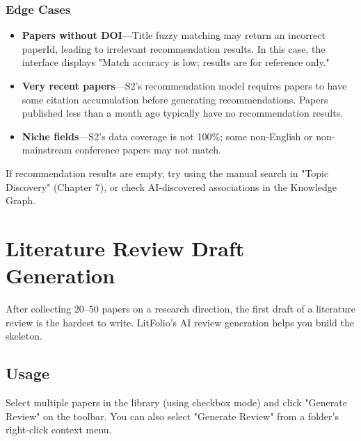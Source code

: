 \subsection{Edge Cases}

\begin{itemize}
  \item \textbf{Papers without DOI}---Title fuzzy matching may return an incorrect paperId,
    leading to irrelevant recommendation results. In this case, the interface displays "Match
    accuracy is low; results are for reference only."
  \item \textbf{Very recent papers}---S2's recommendation model requires papers to have some
    citation accumulation before generating recommendations. Papers published less than a month ago
    typically have no recommendation results.
  \item \textbf{Niche fields}---S2's data coverage is not 100\%; some non-English or
    non-mainstream conference papers may not match.
\end{itemize}

\begin{tipbox}
If recommendation results are empty, try using the manual search in "Topic Discovery" (Chapter 7),
or check AI-discovered associations in the Knowledge Graph.
\end{tipbox}

\chapter{Literature Review Draft Generation}
\label{ch:litreview}

After collecting 20--50 papers on a research direction, the first draft of a literature review is
the hardest to write. LitFolio's AI review generation helps you build the skeleton.

\section{Usage}

Select multiple papers in the library (using checkbox mode) and click "Generate Review" on the
toolbar. You can also select "Generate Review" from a folder's right-click context menu.


